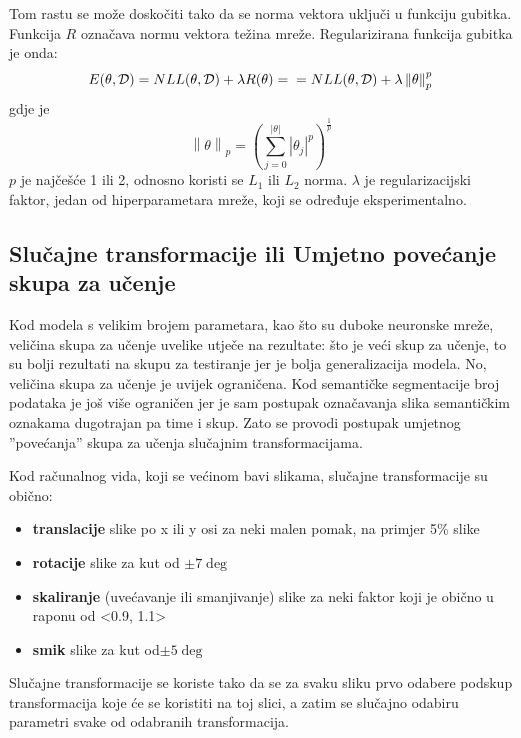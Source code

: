 \documentclass[times, utf8, diplomski, numeric]{fer}
\newcommand{\norm}[1]{\left\lVert#1\right\rVert}
\newcommand{\abs}[1]{\left\lvert#1\right\rvert}
\begin{document}
Tom rastu se može doskočiti tako da se norma vektora uključi u funkciju gubitka. Funkcija $R$ označava normu vektora težina mreže. Regularizirana funkcija gubitka je onda:
\begin{equation}
    E(\theta, \mathcal{D}) = NLL(\theta, \mathcal{D}) + \lambda R(\theta) = \\
    = NLL(\theta, \mathcal{D}) + \lambda \norm{\theta}_p^p
\end{equation}
gdje je
\begin{equation}
    \norm{\theta}_p = (\sum_{j = 0}^{\abs{\theta}} \abs{\theta_j}^p)^{\frac{1}{p}}
\end{equation}
$p$ je najčešće 1 ili 2, odnosno koristi se $L_1$ ili $L_2$ norma. $\lambda$ je regularizacijski faktor, jedan od hiperparametara mreže, koji se određuje eksperimentalno.

\subsection{Slučajne transformacije ili Umjetno povećanje skupa za učenje}
\label{chap:dataset_perturbations}

Kod modela s velikim brojem parametara, kao što su duboke neuronske mreže, veličina skupa za učenje uvelike utječe na rezultate: što je veći skup za učenje, to su bolji rezultati na skupu za testiranje jer je bolja generalizacija modela. No, veličina skupa za učenje je uvijek ograničena. Kod semantičke segmentacije broj podataka je još više ograničen jer je sam postupak označavanja slika semantičkim oznakama dugotrajan pa time i skup.
Zato se provodi postupak umjetnog ''povećanja'' skupa za učenja slučajnim transformacijama.

Kod računalnog vida, koji se većinom bavi slikama, slučajne transformacije su obično:
\begin{itemize}
  \item
  	\textbf{translacije} slike po x ili y osi za neki malen pomak, na primjer 5\% slike
  \item
    \textbf{rotacije} slike za kut od $\pm 7\deg$
  \item
  	\textbf{skaliranje} (uvećavanje ili smanjivanje) slike za neki faktor koji je obično u raponu od <0.9, 1.1>
  \item
    \textbf{smik} slike za kut od$\pm 5\deg$
\end{itemize}

Slučajne transformacije se koriste tako da se za svaku sliku prvo odabere podskup transformacija koje će se koristiti na toj slici, a zatim se slučajno odabiru parametri svake od odabranih transformacija.
\end{document}

